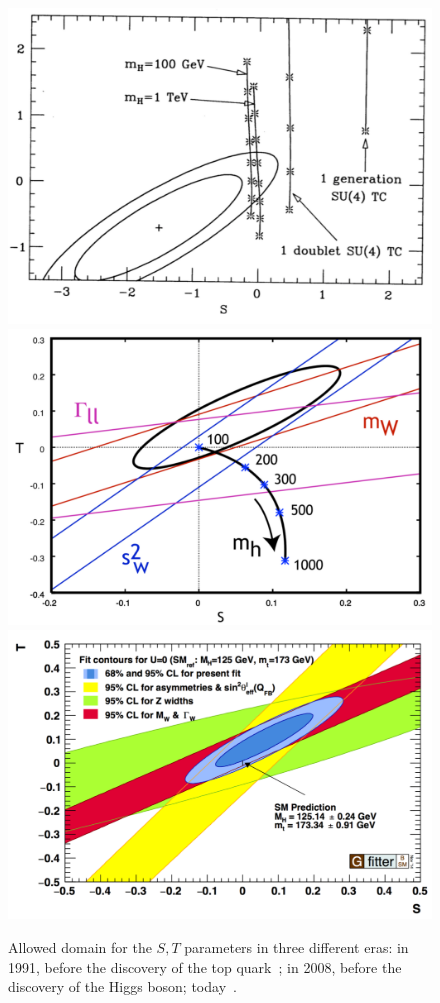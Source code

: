 \documentclass[12pt]{article}
\begin{document}
\begin{figure}
\begin{center}
\includegraphics[width=0.55\hsize]{STa.pdf} \\
\includegraphics[width=0.60\hsize]{STb.pdf} \\
\includegraphics[width=0.60\hsize]{STc.pdf} \\
\end{center}
\caption{Allowed domain for the $S,T$ parameters in three different
  eras:  in 1991, before the discovery of the top quark~\cite{PT}; in
  2008, before the discovery of the Higgs boson; today~\cite{Gfitter}.}
\label{fig:STfits}
\end{figure}
\end{document}
